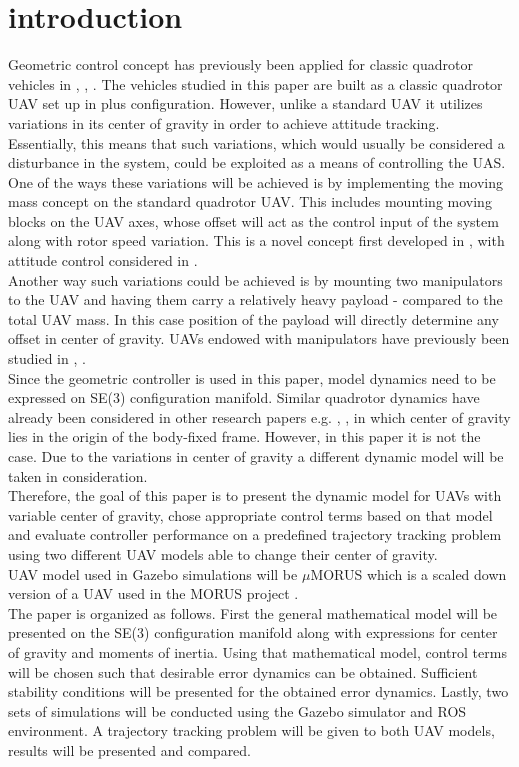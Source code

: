 \section{introduction}

Geometric control concept has previously been applied for classic quadrotor vehicles in \cite{LeeClanak4}, \cite{LeeClanak3}, \cite{LeeClanak1}. The vehicles studied in this paper are built as a classic quadrotor UAV set up in plus configuration. However, unlike a standard UAV it utilizes variations in its center of gravity in order to achieve attitude tracking. Essentially, this means that such variations, which would usually be considered a disturbance in the system, could be exploited as a means of controlling the UAS. \\
One of the ways these variations will be achieved is by implementing the moving mass concept on the standard quadrotor UAV. This includes mounting moving blocks on the UAV axes, whose offset will act as the control input of the system along with rotor speed variation. This is a novel concept first developed in \cite{movingMass1},\cite{movingMass2} with attitude control considered in \cite{movingMass3}.   \\
Another way such variations could be achieved is by mounting two manipulators to the UAV and having them carry a relatively heavy payload - compared to the total UAV mass. In this case position of the payload will directly determine any offset in center of gravity. UAVs endowed with manipulators have previously been studied in \cite{manipulator1}, \cite{manipulator2}.\\
Since the geometric controller is used in this paper, model dynamics need to be expressed on SE(3) configuration manifold. Similar quadrotor dynamics have already been considered in other research papers e.g. \cite{LeeClanak4}, \cite{LeeClanak2}, \cite{LeeClanak1} in which center of gravity lies in the origin of the body-fixed frame. However, in this paper it is not the case. Due to the variations in center of gravity a different dynamic model will be taken in consideration. \\
Therefore, the goal of this paper is to present the dynamic model for UAVs with variable center of gravity, chose appropriate control terms based on that model and evaluate controller performance on a predefined trajectory tracking problem using two different UAV models able to change their center of gravity. \\
UAV model used in Gazebo simulations will be $\mu$MORUS which is a scaled down version of a UAV used in the MORUS project \cite{MORUSweb}. \\
The paper is organized as follows. First the general mathematical model will be presented on the SE(3) configuration manifold along with expressions for center of gravity and moments of inertia. Using that mathematical model, control terms will be chosen such that desirable error dynamics can be obtained. Sufficient stability conditions will be presented for the obtained error dynamics. Lastly, two sets of simulations will be conducted using the Gazebo simulator and ROS environment. A trajectory tracking problem will be given to both UAV models, results will be presented and compared.